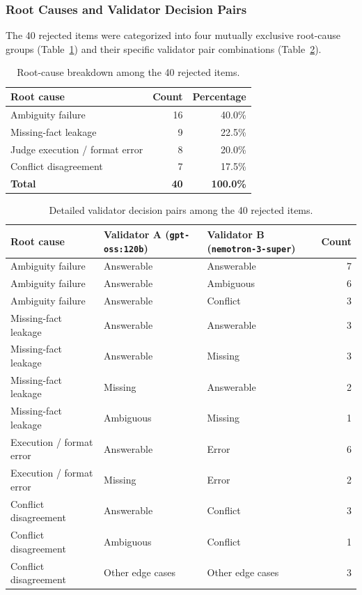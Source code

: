 \documentclass[11pt,letterpaper]{article}
\begin{document}
\subsubsection{Root Causes and Validator Decision Pairs}
The 40 rejected items were categorized into four mutually exclusive root-cause groups (Table~\ref{tab:rejection_causes}) and their specific validator pair combinations (Table~\ref{tab:judge_decision_pairs}).

\begin{table}[h]
\centering
\small
\caption{Root-cause breakdown among the 40 rejected items.}
\label{tab:rejection_causes}
\begin{tabular}{lrr}
\toprule
\textbf{Root cause} & \textbf{Count} & \textbf{Percentage} \\
\midrule
Ambiguity failure               & 16 & 40.0\% \\
Missing-fact leakage            & 9  & 22.5\% \\
Judge execution / format error  & 8  & 20.0\% \\
Conflict disagreement           & 7  & 17.5\% \\
\midrule
\textbf{Total} & \textbf{40} & \textbf{100.0\%} \\
\bottomrule
\end{tabular}
\end{table}

\begin{table}[t]
\centering
\small
\caption{Detailed validator decision pairs among the 40 rejected items.}
\label{tab:judge_decision_pairs}
\begin{tabular}{lllr}
\toprule
\textbf{Root cause} & \textbf{Validator A (\texttt{gpt-oss:120b})} & \textbf{Validator B (\texttt{nemotron-3-super})} & \textbf{Count} \\
\midrule
Ambiguity failure        & Answerable & Answerable & 7 \\
Ambiguity failure        & Answerable & Ambiguous  & 6 \\
Ambiguity failure        & Answerable & Conflict   & 3 \\
\midrule
Missing-fact leakage     & Answerable & Answerable & 3 \\
Missing-fact leakage     & Answerable & Missing    & 3 \\
Missing-fact leakage     & Missing    & Answerable & 2 \\
Missing-fact leakage     & Ambiguous  & Missing    & 1 \\
\midrule
Execution / format error & Answerable & Error      & 6 \\
Execution / format error & Missing    & Error      & 2 \\
\midrule
Conflict disagreement    & Answerable & Conflict   & 3 \\
Conflict disagreement    & Ambiguous  & Conflict   & 1 \\
Conflict disagreement    & Other edge cases & Other edge cases & 3 \\
\bottomrule
\end{tabular}
\end{table}
\end{document}

